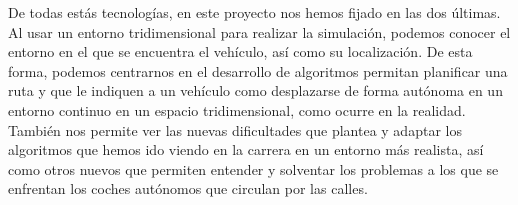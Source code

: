 De todas estás tecnologías, en este proyecto nos hemos fijado en las dos últimas. Al usar un entorno tridimensional para realizar la simulación, podemos conocer el entorno en el que se encuentra el vehículo, así como su localización. De esta forma, podemos centrarnos en el desarrollo de algoritmos permitan planificar una ruta y que le indiquen a un vehículo como desplazarse de forma autónoma en un entorno continuo en un espacio tridimensional, como ocurre en la realidad. También nos permite ver las nuevas dificultades que plantea y adaptar los algoritmos que hemos ido viendo en la carrera en un entorno más realista, así como otros nuevos que permiten entender y solventar los problemas a los que se enfrentan los coches autónomos que circulan por las calles.
